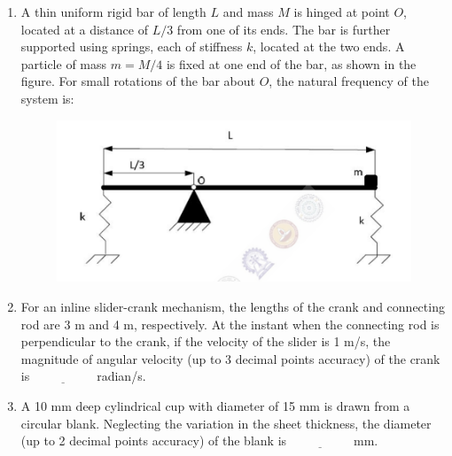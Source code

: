 \documentclass[journal]{IEEEtran}
\begin{document}
\begin{enumerate}[leftmargin=0pt]
    \item A thin uniform rigid bar of length $L$ and mass $M$ is hinged at point $O$, located at a distance of $L/3$ from one of its ends. The bar is further supported using springs, each of stiffness $k$, located at the two ends. A particle of mass $m = M/4$ is fixed at one end of the bar, as shown in the figure. For small rotations of the bar about $O$, the natural frequency of the system is:
    \hfill{}
    \begin{figure}[h]
    \centering
    \includegraphics[width=0.5\columnwidth]{Figs/image (29).png}
    \caption*{}
    \label{fig:46}
    \end{figure}
    \begin{enumerate}
    \end{enumerate}

    \item For an inline slider-crank mechanism, the lengths of the crank and connecting rod are 3 m and 4 m, respectively. At the instant when the connecting rod is perpendicular to the crank, if the velocity of the slider is 1 m/s, the magnitude of angular velocity (up to 3 decimal points accuracy) of the crank is $\underline{\hspace{2cm}}$ radian/s.
    \hfill{}

    \item A 10 mm deep cylindrical cup with diameter of 15 mm is drawn from a circular blank. Neglecting the variation in the sheet thickness, the diameter (up to 2 decimal points accuracy) of the blank is $\underline{\hspace{2cm}}$ mm.
    \hfill{}


\end{enumerate}
\end{document}
